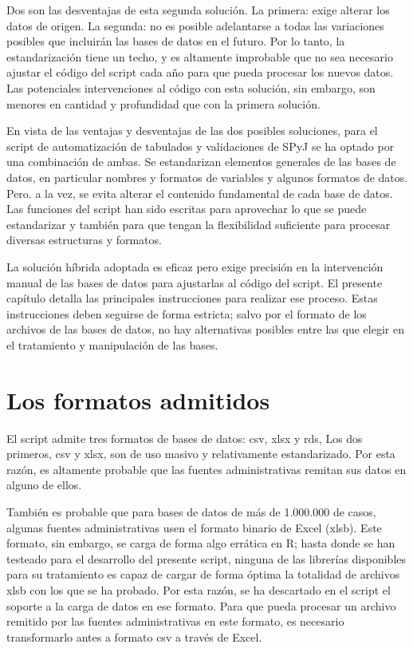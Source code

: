 \documentclass[
  spanish,
]{book}
\begin{document}
Dos son las desventajas de esta segunda solución. La primera: exige alterar los datos de origen. La segunda: no es posible adelantarse a todas las variaciones posibles que incluirán las bases de datos en el futuro. Por lo tanto, la estandarización tiene un techo, y es altamente improbable que no sea necesario ajustar el código del script cada año para que pueda procesar los nuevos datos. Las potenciales intervenciones al código con esta solución, sin embargo, son menores en cantidad y profundidad que con la primera solución.

En vista de las ventajas y desventajas de las dos posibles soluciones, para el script de automatización de tabulados y validaciones de SPyJ se ha optado por una combinación de ambas. Se estandarizan elementos generales de las bases de datos, en particular nombres y formatos de variables y algunos formatos de datos. Pero. a la vez, se evita alterar el contenido fundamental de cada base de datos. Las funciones del script han sido escritas para aprovechar lo que se puede estandarizar y también para que tengan la flexibilidad suficiente para procesar diversas estructuras y formatos.

La solución híbrida adoptada es eficaz pero exige precisión en la intervención manual de las bases de datos para ajustarlas al código del script. El presente capítulo detalla las principales instrucciones para realizar ese proceso. Estas instrucciones deben seguirse de forma estricta; salvo por el formato de los archivos de las bases de datos, no hay alternativas posibles entre las que elegir en el tratamiento y manipulación de las bases.

\hypertarget{los-formatos-admitidos}{%
\section{Los formatos admitidos}\label{los-formatos-admitidos}}

El script admite tres formatos de bases de datos: csv, xlsx y rds, Los dos primeros, csv y xlsx, son de uso masivo y relativamente estandarizado. Por esta razón, es altamente probable que las fuentes administrativas remitan sus datos en alguno de ellos.

También es probable que para bases de datos de más de 1.000.000 de casos, algunas fuentes administrativas usen el formato binario de Excel (xlsb). Este formato, sin embargo, se carga de forma algo errática en R; hasta donde se han testeado para el desarrollo del presente script, ninguna de las librerías disponibles para su tratamiento es capaz de cargar de forma óptima la totalidad de archivos xlsb con los que se ha probado. Por esta razón, se ha descartado en el script el soporte a la carga de datos en ese formato. Para que pueda procesar un archivo remitido por las fuentes administrativas en este formato, es necesario transformarlo antes a formato csv a través de Excel.
\end{document}
